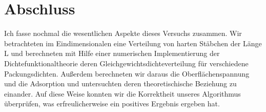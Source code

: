 \documentclass[12pt]{article}
\begin{document}
\section{Abschluss}
Ich fasse nochmal die wesentlichen Aspekte dieses Versuchs zusammen. Wir betrachteten im Eindimensionalen eine Verteilung von harten Stäbchen der Länge L und berechneten mit Hilfe einer numerischen Implementierung der Dichtefunktionaltheorie deren Gleichgewichtsdichteverteilung für verschiedene Packungsdichten. Außerdem berechneten wir daraus die Oberflächenspannung und die Adsorption und untersuchten deren theoretischische Beziehung zu einander. Auf diese Weise konnten wir die Korrektheit unseres Algorithmus überprüfen, was erfreulicherweise ein positives Ergebnis ergeben hat.
\end{document}
